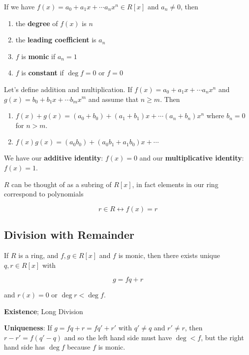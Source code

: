 \documentclass[12pt]{article}
\begin{document}

If we have $f(x) = a_0 + a_1 x + \cdots a_n x^n \in R[x]$ and $a_n \ne 0$, then


\begin{enumerate}
  \item the {\bf degree} of $f(x)$ is $n$
  \item the {\bf leading coefficient} is $a_n$
  \item $f$ is {\bf monic} if $a_n = 1$
  \item $f$ is {\bf constant} if $\deg f = 0$ or $f = 0$
\end{enumerate}


Let's define addition and multiplication. If $f(x) = a_0 + a_1 x + \cdots a_n
x^n$ and $g(x) = b_0 + b_1 x + \cdots b_m x^m$ and assume that $n \ge m$. Then 

\begin{enumerate}
  \item $f(x) + g(x) = (a_0 + b_0) + (a_1 + b_1)x + \cdots (a_n + b_n)x^n$ where
    $b_n = 0$ for $n > m$.

  \item $f(x)g(x) = (a_0 b_0) + (a_0 b_1 + a_1 b_0)x + \cdots $
\end{enumerate}

We have our {\bf additive identity}: $f(x) = 0$ and our {\bf multiplicative
identity}: $f(x) = 1$.

$R$ can be thought of as a subring of $R[x]$, in fact elements in our ring
correspond to polynomials

\[
  r \in R \leftrightarrow f(x) = r
\]

\subsection{Division with Remainder}

If $R$ is a ring, and $f, g \in R[x]$ and $f$ is monic, then there exists unique
$q, r \in R[x]$ with

\[
  g = fq + r
\]

and $r(x) = 0$ or $\deg r < \deg f$.

{\bf Existence}; Long Division

{\bf Uniqueness}: If $g = fq + r = fq' + r'$ with $q' \ne q$ and $r' \ne r$,
then $r - r' = f(q' - q)$ and so the left hand side must have $\deg < f$, but
the right hand side has $\deg f$ because $f$ is monic.
\end{document}
